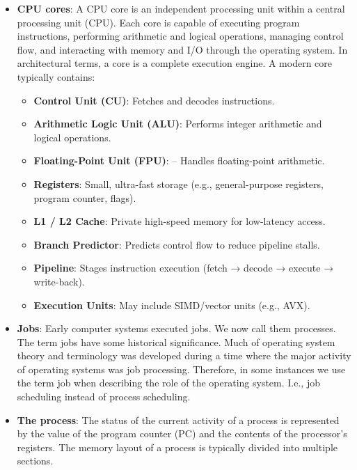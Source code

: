 \documentclass{report}
\begin{document}
    \pagebreak 
    \begin{itemize}
        \item \textbf{CPU cores}: A CPU core is an independent processing unit within a central processing unit (CPU). Each core is capable of executing program instructions, performing arithmetic and logical operations, managing control flow, and interacting with memory and I/O through the operating system. In architectural terms, a core is a complete execution engine.
            \bigbreak \noindent 
            A modern core typically contains:
            \begin{itemize}
                \item \textbf{Control Unit (CU)}: Fetches and decodes instructions.
                \item \textbf{Arithmetic Logic Unit (ALU)}: Performs integer arithmetic and logical operations.
                \item \textbf{Floating-Point Unit (FPU)}: – Handles floating-point arithmetic.
                \item \textbf{Registers}: Small, ultra-fast storage (e.g., general-purpose registers, program counter, flags).
                \item \textbf{L1 / L2 Cache}: Private high-speed memory for low-latency access.
                \item \textbf{Branch Predictor}: Predicts control flow to reduce pipeline stalls.
                \item \textbf{Pipeline}: Stages instruction execution (fetch → decode → execute → write-back).
                \item \textbf{Execution Units}: May include SIMD/vector units (e.g., AVX).
            \end{itemize}
        \item \textbf{Jobs}: Early computer systems executed jobs. We now call them processes. The term jobs have some historical significance. Much of operating system theory and terminology was developed during a time where the major activity of operating systems was job processing.
            \bigbreak \noindent 
            Therefore, in some instances we use the term job when describing the role of the operating system. I.e., job scheduling instead of process scheduling.
        \item \textbf{The process}: The status of the current activity of a process is represented by the value of the program counter (PC) and the contents of the processor’s registers. The memory layout of a process is typically divided into multiple sections.

\end{itemize}
\end{document}
